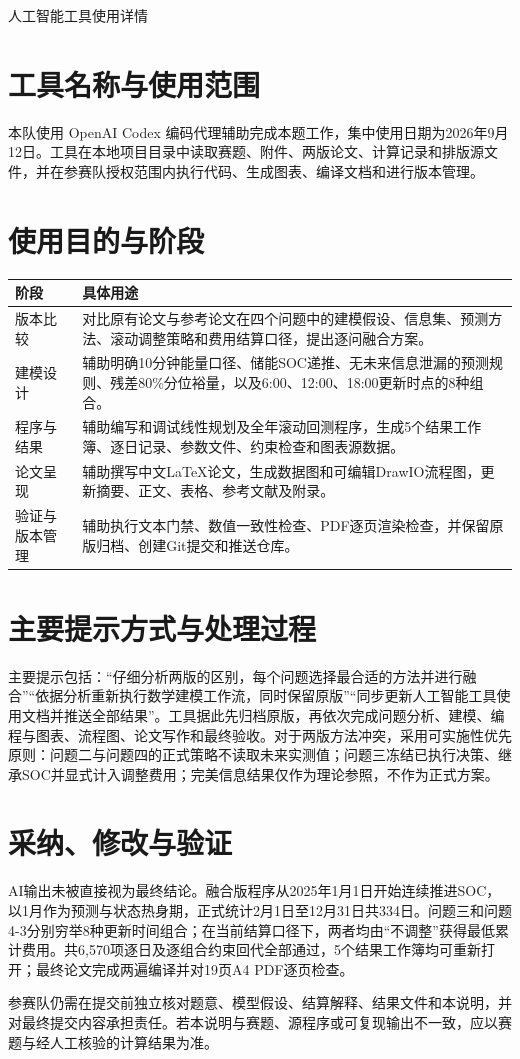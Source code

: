 \documentclass[fontset=fandol,10pt,a4paper]{ctexart}
\begin{document}
\begin{center}
{\heiti 人工智能工具使用详情}
\end{center}

\section{工具名称与使用范围}
本队使用 OpenAI Codex 编码代理辅助完成本题工作，集中使用日期为2026年9月12日。工具在本地项目目录中读取赛题、附件、两版论文、计算记录和排版源文件，并在参赛队授权范围内执行代码、生成图表、编译文档和进行版本管理。

\section{使用目的与阶段}
\begin{longtable}{p{}p{}}
\toprule 阶段 & 具体用途\\\midrule
版本比较 & 对比原有论文与参考论文在四个问题中的建模假设、信息集、预测方法、滚动调整策略和费用结算口径，提出逐问融合方案。\\
建模设计 & 辅助明确10分钟能量口径、储能SOC递推、无未来信息泄漏的预测规则、残差80\%分位裕量，以及6:00、12:00、18:00更新时点的8种组合。\\
程序与结果 & 辅助编写和调试线性规划及全年滚动回测程序，生成5个结果工作簿、逐日记录、参数文件、约束检查和图表源数据。\\
论文呈现 & 辅助撰写中文LaTeX论文，生成数据图和可编辑DrawIO流程图，更新摘要、正文、表格、参考文献及附录。\\
验证与版本管理 & 辅助执行文本门禁、数值一致性检查、PDF逐页渲染检查，并保留原版归档、创建Git提交和推送仓库。\\
\bottomrule
\end{longtable}

\section{主要提示方式与处理过程}
主要提示包括：“仔细分析两版的区别，每个问题选择最合适的方法并进行融合”“依据分析重新执行数学建模工作流，同时保留原版”“同步更新人工智能工具使用文档并推送全部结果”。工具据此先归档原版，再依次完成问题分析、建模、编程与图表、流程图、论文写作和最终验收。对于两版方法冲突，采用可实施性优先原则：问题二与问题四的正式策略不读取未来实测值；问题三冻结已执行决策、继承SOC并显式计入调整费用；完美信息结果仅作为理论参照，不作为正式方案。

\section{采纳、修改与验证}
AI输出未被直接视为最终结论。融合版程序从2025年1月1日开始连续推进SOC，以1月作为预测与状态热身期，正式统计2月1日至12月31日共334日。问题三和问题4-3分别穷举8种更新时间组合；在当前结算口径下，两者均由“不调整”获得最低累计费用。共6,570项逐日及逐组合约束回代全部通过，5个结果工作簿均可重新打开；最终论文完成两遍编译并对19页A4 PDF逐页检查。

参赛队仍需在提交前独立核对题意、模型假设、结算解释、结果文件和本说明，并对最终提交内容承担责任。若本说明与赛题、源程序或可复现输出不一致，应以赛题与经人工核验的计算结果为准。
\end{document}
